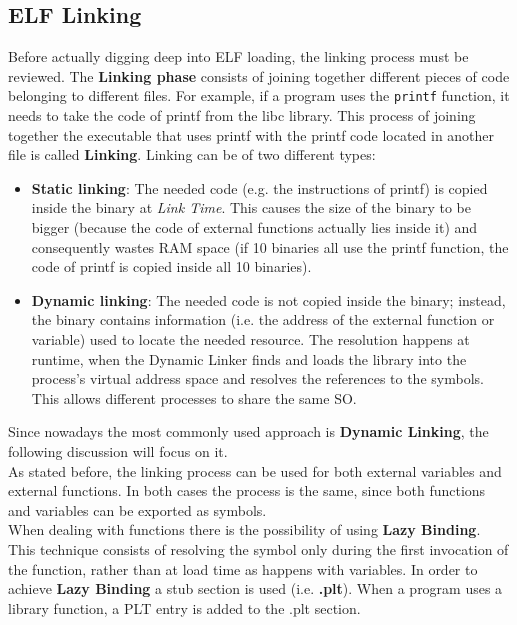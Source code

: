 \subsection{ELF Linking}
    Before actually digging deep into \gls{ELF} loading, the linking process must be reviewed.
    The \textbf{Linking phase} consists of joining together different pieces of code belonging to different files.
    For example, if a program uses the \texttt{printf} function, it needs to take the code of printf from the libc library.
    This process of joining together the executable that uses printf with the printf code located in another file 
    is called \textbf{Linking}. Linking can be of two different types: 
    \begin{itemize}
        \item \textbf{Static linking}: The needed code (e.g. the instructions of printf) is copied inside the binary 
        at \textit{Link Time}. This causes the size of the binary to be bigger (because the code 
        of external functions actually lies inside it) and consequently wastes RAM space (if 10 binaries all use the 
        printf function, the code of printf is copied inside all 10 binaries).
        \item \textbf{Dynamic linking}: The needed code is not copied inside the binary; instead, the binary contains information (i.e. 
        the address of the external function or variable) used to locate the needed resource.
        The resolution happens at runtime, when the Dynamic Linker finds and loads the library into the process's virtual address space and 
        resolves the references to the symbols. This allows different processes to share the same \gls{SO}.
    \end{itemize}
    Since nowadays the most commonly used approach is \textbf{Dynamic Linking}, the following discussion will focus on it.\\
    As stated before, the linking process can be used for both external variables and external functions.
    In both cases the process is the same, since both functions and variables can be exported as symbols.\\
    When dealing with functions there is the possibility of using \textbf{Lazy Binding}.
    This technique consists of resolving the symbol only during the first invocation of the function, rather than at load time 
    as happens with variables.
    In order to achieve \textbf{Lazy Binding} a stub section is used (i.e. \textbf{.plt}).
    When a program uses a library function, a \gls{PLT} entry is added to the .plt section.

